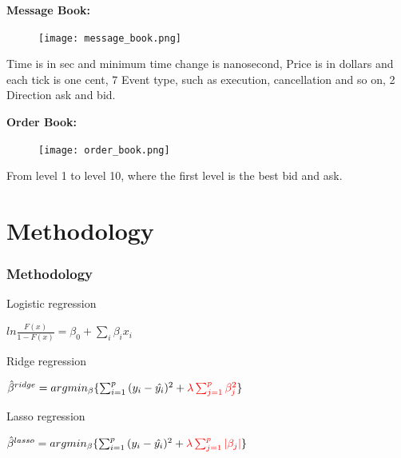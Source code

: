 \documentclass[xcolor={x11names,svgnames,dvipsnames}]{beamer}
\begin{document}
\begin{frame}
\textbf{Message Book:}
 \begin{figure}
     \texttt{[image: message\_book.png]}
\end{figure}
Time is in sec and minimum time change is nanosecond, Price is in dollars and each tick is one cent, 7 Event type, such as execution, cancellation and so on, 2 Direction ask and bid. 
\end{frame}


\begin{frame}
	\textbf{Order Book:}
	\begin{figure}
		\texttt{[image: order\_book.png]}
	\end{figure}
From level 1 to level 10, where the first level is the best bid and ask.	
\end{frame}



\section{Methodology}

\begin{frame}
\frametitle{Methodology}
%
\begin{block}{Logistic regression}
\begin{center}
$ln{\frac{F(x)}{1-F(x)}}=\beta_0+\sum_i\beta_ix_i$\\
\end{center}
\end{block}

\begin{block}{Ridge regression}
\begin{center}
$\hat{\beta}^{ridge}=argmin_{\beta}\{\sum_{i=1}^p{(y_i-\hat{y_i})^2}+{\color{red}\lambda \sum_{j=1}^p\beta_j^2}\}$
\\
\end{center}
\end{block}

\begin{block}{Lasso regression}
\begin{center}
$\hat{\beta}^{lasso}=argmin_{\beta}\{\sum_{i=1}^p{(y_i-\hat{y_i})^2}+{\color{red}\lambda\sum_{j=1}^p |\beta_j|}\}$\\
\end{center}
\end{block}

\end{frame}
\end{document}
